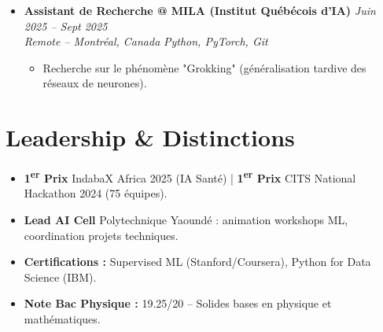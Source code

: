 \documentclass[a4paper,11pt]{article}
\begin{document}
\begin{itemize}[leftmargin=*, label={-}]
\item \textbf{Assistant de Recherche @ MILA (Institut Québécois d'IA)} \hfill \textit{Juin 2025 -- Sept 2025} \\
\textit{Remote -- Montréal, Canada} \hfill \textit{Python, PyTorch, Git}
\vspace{-2pt}
    \begin{itemize}[leftmargin=0.4cm, nosep, label=\tiny$\bullet$]
        \item \small{Recherche sur le phénomène "Grokking" (généralisation tardive des réseaux de neurones).}
    \end{itemize}
\vspace{3pt}

\end{itemize}

\section{Leadership \& Distinctions}
\begin{itemize}[leftmargin=*, label=\tiny$\bullet$, nosep]
    \item \small{\textbf{1\textsuperscript{er} Prix} IndabaX Africa 2025 (IA Santé) | \textbf{1\textsuperscript{er} Prix} CITS National Hackathon 2024 (75 équipes).}
    \item \small{\textbf{Lead AI Cell} Polytechnique Yaoundé : animation workshops ML, coordination projets techniques.}
    \item \small{\textbf{Certifications :} Supervised ML (Stanford/Coursera), Python for Data Science (IBM).}
    \item \small{\textbf{Note Bac Physique :} 19.25/20 -- Solides bases en physique et mathématiques.}
\end{itemize}
\end{document}

